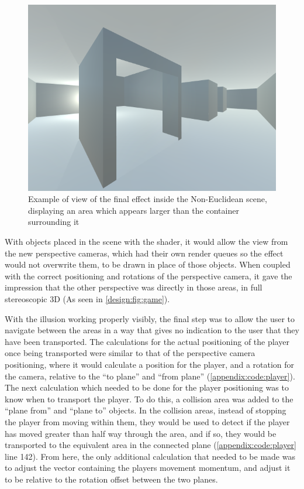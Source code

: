 		\begin{figure}[h]
			\includegraphics[width=1\textwidth]{Images/NE_View}
			\centering
			\caption{Example of view of the final effect inside the Non-Euclidean scene, displaying an area which appears larger than the container surrounding it}
			\label{design:fig:game}
		\end{figure}

		With objects placed in the scene with the shader, it would allow the view from the new perspective cameras, which had their own render queues so the effect would not overwrite them, to be drawn in place of those objects.
		When coupled with the correct positioning and rotations of the perspective camera, it gave the impression that the other perspective was directly in those areas, in full stereoscopic 3D (As seen in \autoref{design:fig:game}).

		With the illusion working properly visibly, the final step was to allow the user to navigate between the areas in a way that gives no indication to the user that they have been transported.
		The calculations for the actual positioning of the player once being transported were similar to that of the perspective camera positioning, where it would calculate a position for the player, and a rotation for the camera, relative to the \enquote{to plane} and \enquote{from plane} (\autoref{appendix:code:player}).
		The next calculation which needed to be done for the player positioning was to know when to transport the player.
		To do this, a collision area was added to the \enquote{plane from} and \enquote{plane to} objects.
		In the collision areas, instead of stopping the player from moving within them, they would be used to detect if the player has moved greater than half way through the area, and if so, they would be transported to the equivalent area in the connected plane (\autoref{appendix:code:player} line 142).
		From here, the only additional calculation that needed to be made was to adjust the vector containing the players movement momentum, and adjust it to be relative to the rotation offset between the two planes.

